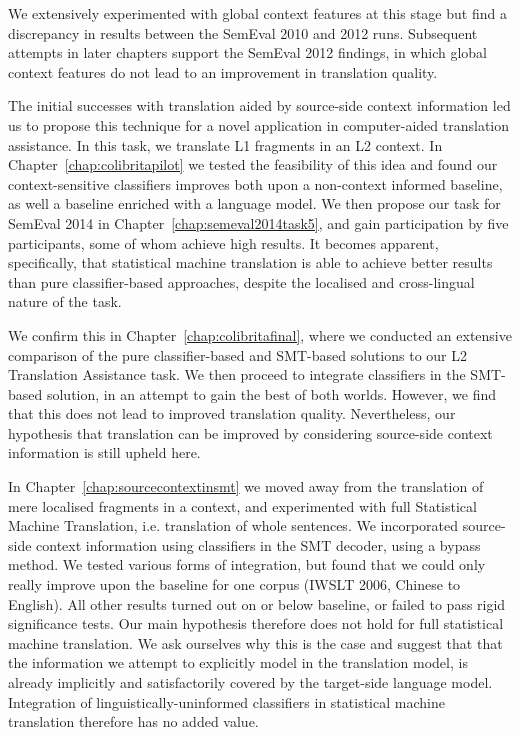 We extensively experimented with global context features at this stage but find
a discrepancy in results between the SemEval 2010 and 2012 runs. Subsequent
attempts in later chapters support the SemEval 2012 findings, in which global
context features do not lead to an improvement in translation quality.

The initial successes with translation aided by source-side context information
led us to propose this technique for a novel application in computer-aided translation
assistance. In this task, we translate L1 fragments in an L2 context.
In Chapter~\ref{chap:colibritapilot} we tested the feasibility of this idea and
found our context-sensitive classifiers improves both upon a non-context informed
baseline, as well a baseline enriched with a language model. We then
propose our task for SemEval 2014 in Chapter~\ref{chap:semeval2014task5}, and gain
participation by five participants, some of whom achieve high results. It
becomes apparent, specifically, that statistical machine translation is able to
achieve better results than pure classifier-based approaches, despite the
localised and cross-lingual nature of the task.

We confirm this in Chapter~\ref{chap:colibritafinal}, where we conducted an
extensive comparison of the pure classifier-based and SMT-based solutions to
our L2 Translation Assistance task. We then proceed to integrate classifiers in
the SMT-based solution, in an attempt to gain the best of both worlds. However,
we find that this does not lead to improved translation quality. Nevertheless,
our hypothesis that translation can be improved by considering source-side
context information is still upheld here. 

In Chapter~\ref{chap:sourcecontextinsmt} we moved away from the translation of
mere localised fragments in a context, and experimented with full Statistical
Machine Translation, i.e. translation of whole sentences. We incorporated
source-side context information using classifiers in the SMT decoder, using a
bypass method. We tested various forms of integration, but found that we could
only really improve upon the baseline for one corpus (IWSLT 2006, Chinese to
English). All other results turned out on or below baseline, or failed to pass
rigid significance tests. Our main hypothesis therefore does not hold for full
statistical machine translation. We ask ourselves why this is the case and
suggest that that the information we attempt to explicitly model in the
translation model, is already implicitly and satisfactorily covered by the
target-side language model. Integration of linguistically-uninformed
classifiers in statistical machine translation therefore has no added value.

